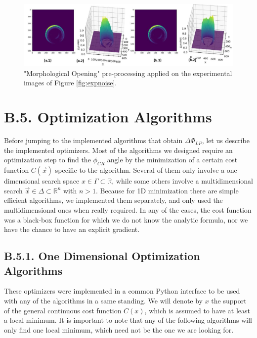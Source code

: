 \documentclass[11pt, a4paper, twoside]{article} %
\newcommand{\R}{\mathbb{R}} %
\begin{document}
\begin{figure}[h!] 
     \centering 
    \includegraphics[width=0.9\linewidth]{open.jpg}
    \caption{"Morphological Opening" pre-processing applied on the experimental images of Figure \ref{fig:expnoise}.}
    \label{fig:preprocessingOpening}
\end{figure}\vspace{-0.5cm}

\section*{B.5. Optimization Algorithms\vspace{-0.2cm}}
 Before jumping to the implemented algorithms that obtain $\Delta\Phi_{LP}$, let us describe the implemented optimizers. Most of the algorithms we designed require an optimization step to find the $\phi_{CR}$ angle by  the minimization of a certain cost function $C(\vec{x})$ specific to the algorithm. Several of them only involve a one dimensional search space $x\in\Gamma\subset\R$, while some others involve a multidimensional search $\vec{x}\in\Delta\subset \R^n$ with $n>1$. Because for 1D minimization there are simple efficient algorithms, we implemented them separately, and only used the multidimensional ones when really required. In any of the cases, the cost function was a black-box function for which we do not know the analytic formula, nor we have the chance to have an explicit gradient.\vspace{-0.25cm}

\subsection*{B.5.1. One Dimensional Optimization Algorithms\vspace{-0.2cm}}
These optimizers were implemented in a common Python interface to be used with any of the algorithms in a same standing. We will denote by $x$ the support of the general continuous cost function $C(x)$, which is assumed to have at least a local minimum. It is important to note that any of the following algorithms will only find one local minimum, which need not be the one we are looking for.\vspace{-0.5cm}
\end{document}
